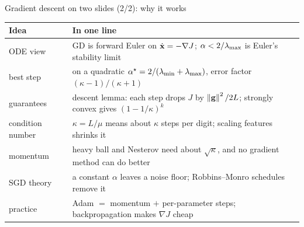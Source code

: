 \begin{frame}{Gradient descent on two slides (2/2): why it works}
  \centering\footnotesize
  \renewcommand{\arraystretch}{1.45}
  \begin{tabular}{@{}l l@{}}
    \toprule
    Idea & In one line \\
    \midrule
    ODE view & GD is forward Euler on $\dot{\mathbf{x}} = -\nabla J$; $\alpha < 2/\lambda_{\max}$ is Euler's stability limit \\
    best step & on a quadratic $\alpha^\star = 2/(\lambda_{\min} + \lambda_{\max})$, error factor $(\kappa - 1)/(\kappa + 1)$ \\
    guarantees & descent lemma: each step drops $J$ by $\left\lVert \mathbf{g} \right\rVert^2/2L$; strongly convex gives $(1 - 1/\kappa)^k$ \\
    condition number & $\kappa = L/\mu$ means about $\kappa$ steps per digit; scaling features shrinks it \\
    momentum & heavy ball and Nesterov need about $\sqrt\kappa$, and no gradient method can do better \\
    SGD theory & a constant $\alpha$ leaves a noise floor; Robbins--Monro schedules remove it \\
    practice & Adam $=$ momentum $+$ per-parameter steps; backpropagation makes $\nabla J$ cheap \\
    \bottomrule
  \end{tabular}
\end{frame}

